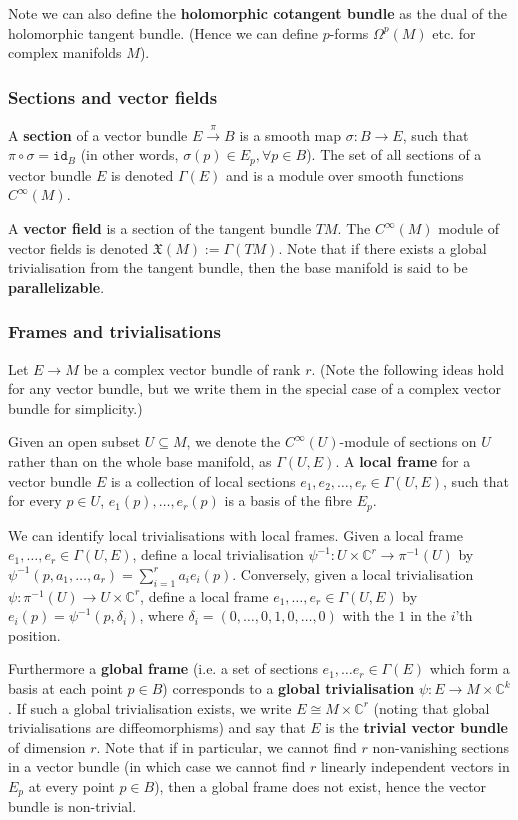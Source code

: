 \documentclass[a4paper]{article}
\theoremstyle{definition} \newtheorem*{definition}{Definition}
\theoremstyle{definition} \newtheorem*{definitions}{Definitions}
\theoremstyle{plain} \newtheorem{theorem}{Theorem}[section]
\theoremstyle{plain} \newtheorem{proposition}[theorem]{Proposition}
\theoremstyle{plain} \newtheorem{corollary}[theorem]{Corollary}
\theoremstyle{plain} \newtheorem{lemma}[theorem]{Lemma}
\theoremstyle{plain} \newtheorem{example}[theorem]{Example}
\newcommand{\defn}[1]{\textbf{#1}}
\newcommand{\complexnos}{\mathbb{C}}
\newcommand{\id}{\mathtt{id}}
\begin{document}
Note we can also define the \defn{holomorphic cotangent bundle} as the dual of the holomorphic tangent bundle. (Hence we can define $p$-forms $\Omega^p(M)$ etc. for complex manifolds $M$).

\subsubsection{Sections and vector fields}
A \defn{section} of a vector bundle $E\xrightarrow{\pi} B$ is a smooth map $\sigma:B\rightarrow E$, such that $\pi \circ \sigma=\id_B$ (in other words, $\sigma(p)\in E_p, \forall p\in B$). The set of all sections of a vector bundle $E$ is denoted $\Gamma (E)$ and is a module over smooth functions $C^\infty(M)$.

A \defn{vector field} is a section of the tangent bundle $TM$. The $C^\infty (M)$ module of vector fields is denoted $\mathfrak{X}(M):=\Gamma(TM)$. Note that if there exists a global trivialisation from the tangent bundle, then the base manifold is said to be \defn{parallelizable}. 

\subsubsection{Frames and trivialisations}

Let $E\to M$ be a complex vector bundle of rank $r$. (Note the following ideas hold for any vector bundle, but we write them in the special case of a complex vector bundle for simplicity.) 

Given an open subset $U\subseteq M$, we denote the $C^\infty (U)$-module of sections on $U$ rather than on the whole base manifold, as $\Gamma (U, E)$. A \defn{local frame} for a vector bundle $E$ is a collection of local sections $e_1, e_2, \ldots, e_r\in \Gamma (U, E)$, such that for every $p\in U$, $e_1(p),\ldots, e_r(p)$ is a basis of the fibre $E_p$. 

We can identify local trivialisations with local frames. Given a local frame $e_1, \ldots, e_r\in \Gamma(U, E)$, define a local trivialisation $\psi^{-1}:U\times \complexnos^r \to \pi^{-1}(U)$ by
$\psi^{-1}(p, a_1, \ldots, a_r) = \sum_{i=1}^r a_ie_i(p)$. Conversely, given a local trivialisation $\psi:\pi^{-1}(U) \to U\times \complexnos^r$, define a local frame $e_1,\ldots , e_r\in \Gamma(U, E)$ by $e_i(p)=\psi^{-1} (p, \delta_i)$, where $\delta_i = (0, \ldots, 0, 1, 0, \ldots, 0)$ with the $1$ in the $i$'th position. 

Furthermore a \defn{global frame} (i.e. a set of sections $e_1, \ldots e_r\in \Gamma(E)$ which form a basis at each point $p\in B$) corresponds to a \defn{global trivialisation} $\psi:E \to M\times \complexnos^k$. If such a global trivialisation exists, we write $E\cong M\times \complexnos^r$ (noting that global trivialisations are diffeomorphisms) and say that $E$ is the \defn{trivial vector bundle} of dimension $r$. 
Note that if in particular, we cannot find $r$ non-vanishing sections in a vector bundle (in which case we cannot find $r$ linearly independent vectors in $E_p$ at every point $p\in B$), then a global frame does not exist, hence the vector bundle is non-trivial.  
\end{document}

